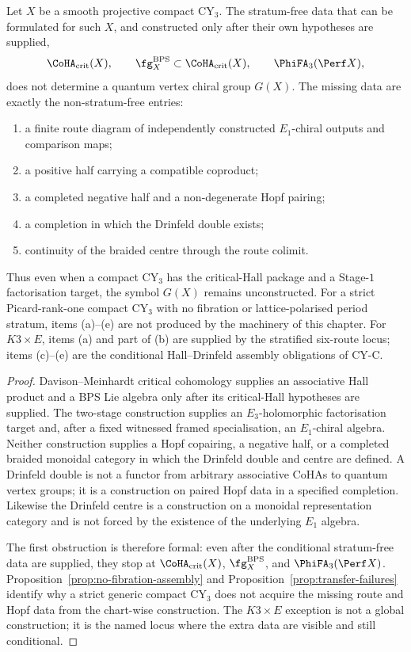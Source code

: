 \begin{theorem}
\label{thm:no-stratum-free-gx}
Let $X$ be a smooth projective compact CY$_3$. The stratum-free data
that can be formulated for such $X$, and constructed only after their
own hypotheses are supplied,
\[
 \CoHA_{\mathrm{crit}}(X),\qquad
 \fg_X^{\mathrm{BPS}}\subset \CoHA_{\mathrm{crit}}(X),\qquad
 \PhiFA_3(\Perf X),
\]
does not determine a quantum vertex chiral group $G(X)$. The missing
data are exactly the non-stratum-free entries:
\begin{enumerate}[label=\textup{(\alph*)}, leftmargin=2.5em]
\item a finite route diagram of independently constructed
$E_1$-chiral outputs and comparison maps;
\item a positive half carrying a compatible coproduct;
\item a completed negative half and a non-degenerate Hopf pairing;
\item a completion in which the Drinfeld double exists;
\item continuity of the braided centre through the route colimit.
\end{enumerate}
Thus even when a compact CY$_3$ has the critical-Hall package and a
Stage-$1$ factorisation target, the symbol $G(X)$ remains
unconstructed.
For a strict Picard-rank-one compact CY$_3$ with no fibration or
lattice-polarised period stratum, items \textup{(a)}--\textup{(e)} are
not produced by the machinery of this chapter. For $K3\times E$, items
\textup{(a)} and part of \textup{(b)} are supplied by the stratified
six-route locus; items \textup{(c)}--\textup{(e)} are the conditional
Hall--Drinfeld assembly obligations of CY-C.
\end{theorem}

\begin{proof}
Davison--Meinhardt critical cohomology supplies an associative Hall
product and a BPS Lie algebra only after its critical-Hall hypotheses
are supplied. The two-stage construction supplies an
$E_3$-holomorphic factorisation target and, after a fixed witnessed
framed specialisation, an $E_1$-chiral algebra. Neither construction
supplies a Hopf copairing, a negative half, or a completed braided
monoidal category in which the Drinfeld double and centre are defined. A
Drinfeld double is not a functor from arbitrary associative CoHAs to
quantum vertex groups; it is a construction on paired Hopf data in a
specified completion. Likewise the Drinfeld centre is a construction on
a monoidal representation category and is not forced by the existence
of the underlying $E_1$ algebra.

The first obstruction is therefore formal: even after the conditional
stratum-free data are supplied, they stop at
$\CoHA_{\mathrm{crit}}(X)$, $\fg_X^{\mathrm{BPS}}$, and
$\PhiFA_3(\Perf X)$. Proposition~\ref{prop:no-fibration-assembly} and
Proposition~\ref{prop:transfer-failures} identify why a strict generic
compact CY$_3$ does not acquire the missing route and Hopf data from the
chart-wise construction. The $K3\times E$ exception is not a global
construction; it is the named locus where the extra data are visible
and still conditional.
\end{proof}

